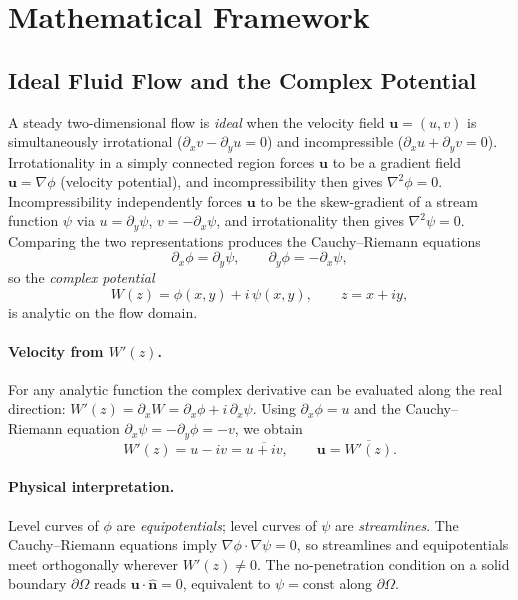 \documentclass[11pt]{article}
\newcommand{\conj}[1]{\overline{#1}}
\begin{document}
\section{Mathematical Framework}
\label{sec:theory}

\subsection{Ideal Fluid Flow and the Complex Potential}
\label{sec:ideal-flow}

A steady two-dimensional flow is \emph{ideal} when the velocity field
$\mathbf{u} = (u, v)$ is simultaneously irrotational
($\partial_x v - \partial_y u = 0$) and incompressible
($\partial_x u + \partial_y v = 0$). Irrotationality in a simply connected
region forces $\mathbf{u}$ to be a gradient field $\mathbf{u} = \nabla \phi$
(velocity potential), and incompressibility then gives $\nabla^2 \phi = 0$.
Incompressibility independently forces $\mathbf{u}$ to be the skew-gradient of
a stream function $\psi$ via $u = \partial_y \psi$, $v = -\partial_x \psi$, and
irrotationality then gives $\nabla^2 \psi = 0$. Comparing the two
representations produces the Cauchy--Riemann equations
\begin{equation}
  \partial_x \phi = \partial_y \psi,
  \qquad
  \partial_y \phi = -\partial_x \psi,
  \label{eq:CR}
\end{equation}
so the \emph{complex potential}
\begin{equation}
  W(z) = \phi(x, y) + i\,\psi(x, y), \qquad z = x + iy,
  \label{eq:W}
\end{equation}
is analytic on the flow domain.

\paragraph{Velocity from $W'(z)$.}
For any analytic function the complex derivative can be evaluated along the
real direction: $W'(z) = \partial_x W = \partial_x \phi + i\, \partial_x \psi$.
Using $\partial_x \phi = u$ and the Cauchy--Riemann equation
$\partial_x \psi = -\partial_y \phi = -v$, we obtain
\begin{equation}
  W'(z) = u - i v = \conj{u + iv},
  \qquad
  \mathbf{u} = \conj{W'(z)}.
  \label{eq:velocity}
\end{equation}

\paragraph{Physical interpretation.}
Level curves of $\phi$ are \emph{equipotentials}; level curves of $\psi$ are
\emph{streamlines}. The Cauchy--Riemann equations imply
$\nabla \phi \cdot \nabla \psi = 0$, so streamlines and equipotentials meet
orthogonally wherever $W'(z) \neq 0$. The no-penetration condition on a solid
boundary $\partial \Omega$ reads $\mathbf{u} \cdot \hat{\mathbf{n}} = 0$,
equivalent to $\psi = \mathrm{const}$ along $\partial \Omega$.
\end{document}

